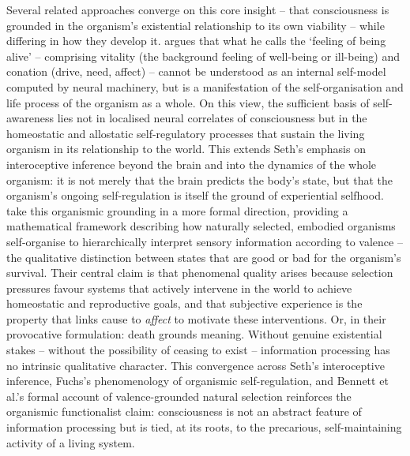 \documentclass[11pt, a4paper, onecolumn, gdm]{google}
\begin{document}
Several related approaches converge on this core insight -- that consciousness is grounded in the organism's existential relationship to its own viability -- while differing in how they develop it.
\citet{fuchs2026} argues that what he calls the `feeling of being alive' -- comprising vitality (the background feeling of well-being or ill-being) and conation (drive, need, affect) -- cannot be understood as an internal self-model computed by neural machinery, but is a manifestation of the self-organisation and life process of the organism as a whole.
On this view, the sufficient basis of self-awareness lies not in localised neural correlates of consciousness but in the homeostatic and allostatic self-regulatory processes that sustain the living organism in its relationship to the world.
This extends Seth's emphasis on interoceptive inference beyond the brain and into the dynamics of the whole organism: it is not merely that the brain predicts the body's state, but that the organism's ongoing self-regulation is itself the ground of experiential selfhood.
\citet{bennett2026} take this organismic grounding in a more formal direction, providing a mathematical framework describing how naturally selected, embodied organisms self-organise to hierarchically interpret sensory information according to valence -- the qualitative distinction between states that are good or bad for the organism's survival.
Their central claim is that phenomenal quality arises because selection pressures favour systems that actively intervene in the world to achieve homeostatic and reproductive goals, and that subjective experience is the property that links cause to \emph{affect} to motivate these interventions.
Or, in their provocative formulation: death grounds meaning.
Without genuine existential stakes -- without the possibility of ceasing to exist -- information processing has no intrinsic qualitative character.
This convergence across Seth's interoceptive inference, Fuchs's phenomenology of organismic self-regulation, and Bennett et al.'s formal account of valence-grounded natural selection reinforces the organismic functionalist claim: consciousness is not an abstract feature of information processing but is tied, at its roots, to the precarious, self-maintaining activity of a living system.
\end{document}
